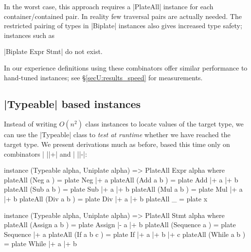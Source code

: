 In the worst case, this approach requires a |PlateAll| instance for each container/contained pair. In reality few traversal pairs are actually needed. The restricted pairing of types in |Biplate| instances also gives increased type safety; instances such as \ignore|Biplate Expr Stmt| do not exist.

In our experience definitions using these combinators offer similar performance to hand-tuned instances; see \S\ref{secU:results_speed} for measurements.


\subsection{|Typeable| based instances}
\label{secU:implement_playtypeable}

Instead of writing $O(n^2)$ class instances to locate values of the target type, we can use the |Typeable| class to \textit{test at runtime} whether we have reached the target type. We present derivations much as before, based this time only on combinators | ||+| and | ||-|:

\begin{comment}
\begin{code}
type Type from to = ([to] -> [to], [to] -> (from,[to]))
uniplateAll :: PlateAll a b => a -> ([b],[b] -> a)
class PlateAll from to where
    plateAll :: from -> Type from to
plate :: from -> Type from to
(|+) :: (Typeable item, Typeable to, PlateAll item to) => Type (item -> from) to -> item -> Type from to
(|-) :: Type (item -> from) to -> item -> Type from to
instance (PlateAll from to, Typeable from, Typeable to, Uniplate to) => PlateAll [from] to where
\end{code}
\end{comment}

\begin{code}
instance (Typeable alpha, Uniplate alpha) => PlateAll Expr alpha where
    plateAll (Neg a    )  = plate Neg  |+ a
    plateAll (Add a b  )  = plate Add  |+ a |+ b
    plateAll (Sub a b  )  = plate Sub  |+ a |+ b
    plateAll (Mul a b  )  = plate Mul  |+ a |+ b
    plateAll (Div a b  )  = plate Div  |+ a |+ b
    plateAll _            = plate x

instance (Typeable alpha, Uniplate alpha) => PlateAll Stmt alpha where
    plateAll (Assign    a b    ) = plate Assign    |-  a |+ b
    plateAll (Sequence  a      ) = plate Sequence  |+  a
    plateAll (If        a b c  ) = plate If        |+  a |+ b |+ c
    plateAll (While     a b    ) = plate While     |+  a |+ b
\end{code}

